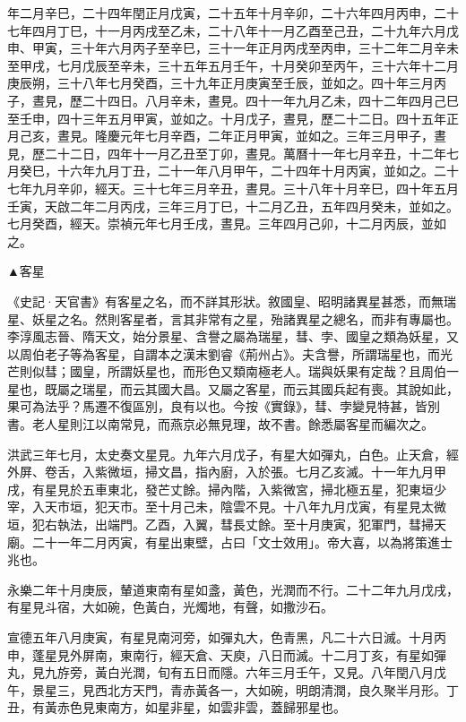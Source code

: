 \begin{pinyinscope}
年二月辛巳，二十四年閏正月戊寅，二十五年十月辛卯，二十六年四月丙申，二十七年四月丁巳，十一月丙戌至乙未，二十八年十一月乙酉至己丑，二十九年六月戊申、甲寅，三十年六月丙子至辛巳，三十一年正月丙戌至丙申，三十二年二月辛未至甲戌，七月戊辰至辛未，三十五年五月壬午，十月癸卯至丙午，三十六年十二月庚辰朔，三十八年七月癸酉，三十九年正月庚寅至壬辰，並如之。四十年三月丙子，晝見，歷二十四日。八月辛未，晝見。四十一年九月乙未，四十二年四月己巳至壬申，四十三年五月甲寅，並如之。十月戊子，晝見，歷二十二日。四十五年正月己亥，晝見。隆慶元年七月辛酉，二年正月甲寅，並如之。三年三月甲子，晝見，歷二十二日，四年十一月乙丑至丁卯，晝見。萬曆十一年七月辛丑，十二年七月癸巳，十六年九月丁丑，二十一年八月甲午，二十四年十月丙寅，並如之。二十七年九月辛卯，經天。三十七年三月辛丑，晝見。三十八年十月辛巳，四十年五月壬寅，天啟二年二月丙戌，三年三月丁巳，十二月乙丑，五年四月癸未，並如之。七月癸酉，經天。崇禎元年七月壬戌，晝見。三年四月己卯，十二月丙辰，並如之。

▲客星

《史記·天官書》有客星之名，而不詳其形狀。敘國皇、昭明諸異星甚悉，而無瑞星、妖星之名。然則客星者，言其非常有之星，殆諸異星之總名，而非有專屬也。李淳風志晉、隋天文，始分景星、含譽之屬為瑞星，彗、孛、國皇之類為妖星，又以周伯老子等為客星，自謂本之漢末劉睿《荊州占》。夫含譽，所謂瑞星也，而光芒則似彗；國皇，所謂妖星也，而形色又類南極老人。瑞與妖果有定哉？且周伯一星也，既屬之瑞星，而云其國大昌。又屬之客星，而云其國兵起有喪。其說如此，果可為法乎？馬遷不復區別，良有以也。今按《實錄》，彗、孛變見特甚，皆別書。老人星則江以南常見，而燕京必無見理，故不書。餘悉屬客星而編次之。

洪武三年七月，太史奏文星見。九年六月戊子，有星大如彈丸，白色。止天倉，經外屏、卷舌，入紫微垣，掃文昌，指內廚，入於張。七月乙亥滅。十一年九月甲戌，有星見於五車東北，發芒丈餘。掃內階，入紫微宮，掃北極五星，犯東垣少宰，入天市垣，犯天市。至十月己未，陰雲不見。十八年九月戊寅，有星見太微垣，犯右執法，出端門。乙酉，入翼，彗長丈餘。至十月庚寅，犯軍門，彗掃天廟。二十一年二月丙寅，有星出東壁，占曰「文士效用」。帝大喜，以為將策進士兆也。

永樂二年十月庚辰，輦道東南有星如盞，黃色，光潤而不行。二十二年九月戊戌，有星見斗宿，大如碗，色黃白，光燭地，有聲，如撒沙石。

宣德五年八月庚寅，有星見南河旁，如彈丸大，色青黑，凡二十六日滅。十月丙申，蓬星見外屏南，東南行，經天倉、天庾，八日而滅。十二月丁亥，有星如彈丸，見九斿旁，黃白光潤，旬有五日而隱。六年三月壬午，又見。八年閏八月戊午，景星三，見西北方天門，青赤黃各一，大如碗，明朗清潤，良久聚半月形。丁丑，有黃赤色見東南方，如星非星，如雲非雲，蓋歸邪星也。


\end{pinyinscope}
